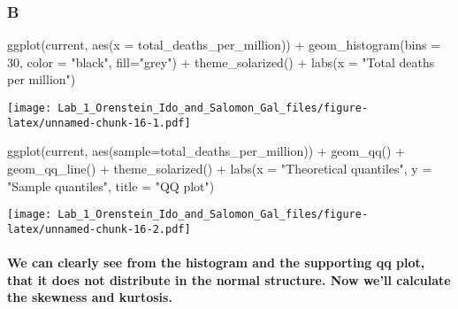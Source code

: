 \documentclass[
]{article}
\newenvironment{Shaded}{\begin{snugshade}}{\end{snugshade}}
\newcommand{\AttributeTok}[1]{\textcolor[rgb]{0.77,0.63,0.00}{#1}}
\newcommand{\DecValTok}[1]{\textcolor[rgb]{0.00,0.00,0.81}{#1}}
\newcommand{\FunctionTok}[1]{\textcolor[rgb]{0.00,0.00,0.00}{#1}}
\newcommand{\NormalTok}[1]{#1}
\newcommand{\SpecialCharTok}[1]{\textcolor[rgb]{0.00,0.00,0.00}{#1}}
\newcommand{\StringTok}[1]{\textcolor[rgb]{0.31,0.60,0.02}{#1}}
\begin{document}
\hypertarget{b-2}{%
\subsubsection{B}\label{b-2}}

\begin{Shaded}
\begin{Highlighting}[]
\FunctionTok{ggplot}\NormalTok{(current, }\FunctionTok{aes}\NormalTok{(}\AttributeTok{x =}\NormalTok{ total\_deaths\_per\_million)) }\SpecialCharTok{+}
  \FunctionTok{geom\_histogram}\NormalTok{(}\AttributeTok{bins =} \DecValTok{30}\NormalTok{, }\AttributeTok{color =} \StringTok{"black"}\NormalTok{, }\AttributeTok{fill=}\StringTok{"grey"}\NormalTok{) }\SpecialCharTok{+}
  \FunctionTok{theme\_solarized}\NormalTok{() }\SpecialCharTok{+}
  \FunctionTok{labs}\NormalTok{(}\AttributeTok{x =} \StringTok{"Total deaths per million"}\NormalTok{)}
\end{Highlighting}
\end{Shaded}

\texttt{[image: Lab\_1\_Orenstein\_Ido\_and\_Salomon\_Gal\_files/figure-latex/unnamed-chunk-16-1.pdf]}

\begin{Shaded}
\begin{Highlighting}[]
\FunctionTok{ggplot}\NormalTok{(current, }\FunctionTok{aes}\NormalTok{(}\AttributeTok{sample=}\NormalTok{total\_deaths\_per\_million)) }\SpecialCharTok{+}
  \FunctionTok{geom\_qq}\NormalTok{() }\SpecialCharTok{+} \FunctionTok{geom\_qq\_line}\NormalTok{() }\SpecialCharTok{+}
  \FunctionTok{theme\_solarized}\NormalTok{() }\SpecialCharTok{+}
  \FunctionTok{labs}\NormalTok{(}\AttributeTok{x =} \StringTok{"Theoretical quantiles"}\NormalTok{, }\AttributeTok{y =} \StringTok{"Sample quantiles"}\NormalTok{, }\AttributeTok{title =} \StringTok{"QQ plot"}\NormalTok{)}
\end{Highlighting}
\end{Shaded}

\texttt{[image: Lab\_1\_Orenstein\_Ido\_and\_Salomon\_Gal\_files/figure-latex/unnamed-chunk-16-2.pdf]}

\hypertarget{we-can-clearly-see-from-the-histogram-and-the-supporting-qq-plot-that-it-does-not-distribute-in-the-normal-structure.-now-well-calculate-the-skewness-and-kurtosis.}{%
\paragraph{We can clearly see from the histogram and the supporting qq
plot, that it does not distribute in the normal structure. Now we'll
calculate the skewness and
kurtosis.}\label{we-can-clearly-see-from-the-histogram-and-the-supporting-qq-plot-that-it-does-not-distribute-in-the-normal-structure.-now-well-calculate-the-skewness-and-kurtosis.}}
\end{document}
